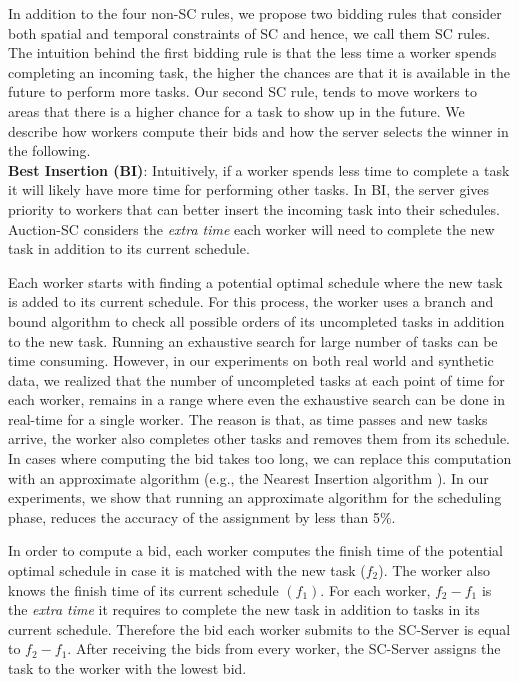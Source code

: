 In addition to the four non-SC rules, we propose two bidding rules that consider both spatial and temporal constraints of SC and hence, we call them SC rules. The intuition behind the first bidding rule is that the less time a worker spends completing an incoming task, the higher the chances are that it is available in the future to perform more tasks. Our second SC rule, tends to move workers to areas that there is a higher chance for a task to show up in the future. We describe how workers compute their bids and how the server selects the winner in the following.\\

\noindent \textbf{Best Insertion (BI)}: 
Intuitively, if a worker spends less time to complete a task it will likely have more time for performing other tasks. In BI, the server gives priority to workers that can better insert the incoming task into their schedules. Auction-SC considers the \textit{extra time} each worker will need to complete the new task in addition to its current schedule.

Each worker starts with finding a potential optimal schedule where the new task is added to its current schedule. For this process, the worker uses a branch and bound algorithm to check all possible orders of its uncompleted tasks in addition to the new task. Running an exhaustive search for large number of tasks can be time consuming. However, in our experiments on both real world and synthetic data, we realized that the number of uncompleted tasks at each point of time for each worker, remains in a range where even the exhaustive search can be done in real-time for a single worker. The reason is that, as time passes and new tasks arrive, the worker also completes other tasks and removes them from its schedule. In cases where computing the bid takes too long, we can replace this computation with an approximate algorithm (e.g., the Nearest Insertion algorithm \cite{Rosenkrantz74}). In our experiments, we show that running an approximate algorithm for the scheduling phase, reduces the accuracy of the assignment by less than 5\%.

In order to compute a bid, each worker computes the finish time of the potential optimal schedule in case it is matched with the new task ($f_2$). The worker also knows the finish time of its current schedule $(f_1)$. For each worker, $f_2-f_1$ is the \textit{extra time} it requires to complete the new task in addition to tasks in its current schedule. Therefore the bid each worker submits to the SC-Server is equal to $f_2 - f_1$. After receiving the bids from every worker, the SC-Server assigns the task to the worker with the lowest bid.\\

